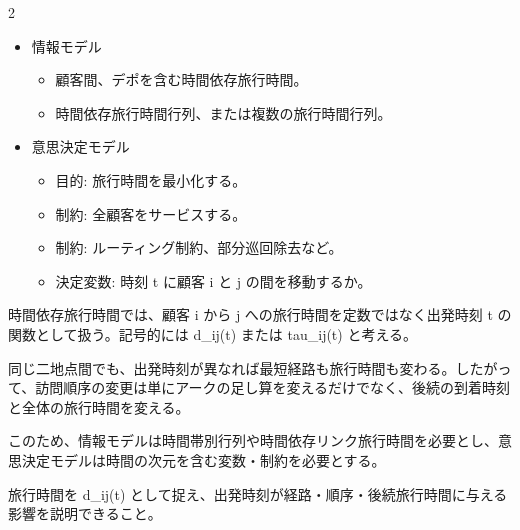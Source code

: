 

\vspace{1.5mm}

\begin{multicols}{2}

\footnotesize

\raggedcolumns


\begin{itemize}
\item 情報モデル
\begin{itemize}
\item 顧客間、デポを含む時間依存旅行時間。
\item 時間依存旅行時間行列、または複数の旅行時間行列。
\end{itemize}
\item 意思決定モデル
\begin{itemize}
\item 目的: 旅行時間を最小化する。
\item 制約: 全顧客をサービスする。
\item 制約: ルーティング制約、部分巡回除去など。
\item 決定変数: 時刻 t に顧客 i と j の間を移動するか。
\end{itemize}
\end{itemize}

時間依存旅行時間では、顧客 i から j への旅行時間を定数ではなく出発時刻 t の関数として扱う。記号的には d\_ij(t) または tau\_ij(t) と考える。\par

同じ二地点間でも、出発時刻が異なれば最短経路も旅行時間も変わる。したがって、訪問順序の変更は単にアークの足し算を変えるだけでなく、後続の到着時刻と全体の旅行時間を変える。\par

このため、情報モデルは時間帯別行列や時間依存リンク旅行時間を必要とし、意思決定モデルは時間の次元を含む変数・制約を必要とする。\par

旅行時間を d\_ij(t) として捉え、出発時刻が経路・順序・後続旅行時間に与える影響を説明できること。\par


\end{multicols}
